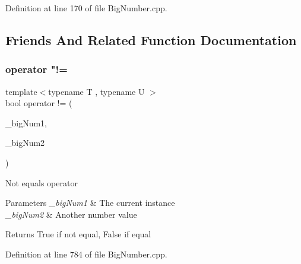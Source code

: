 Definition at line 170 of file Big\+Number.\+cpp.



\subsection{Friends And Related Function Documentation}
\mbox{\label{class_big_nums_1_1_big_number_a7311ab2265ec5536725ffdc2dcfb7dcb}} 
\subsubsection{\texorpdfstring{operator "!=}{operator !=}\hspace{0.1cm}{\footnotesize\ttfamily [1/2]}}
{\footnotesize\ttfamily template$<$typename T , typename U $>$ \\
bool operator != (\begin{DoxyParamCaption}\item[{const \mbox{\hyperlink{class_big_nums_1_1_big_number}{Big\+Number}} \&}]{\+\_\+big\+Num1,  }\item[{const \mbox{\hyperlink{class_big_nums_1_1_big_number}{Big\+Number}} \&}]{\+\_\+big\+Num2 }\end{DoxyParamCaption})\hspace{0.3cm}{\ttfamily [friend]}}

Not equals operator 
\begin{DoxyParams}{Parameters}
{\em \+\_\+big\+Num1} & The current instance \\
\hline
{\em \+\_\+big\+Num2} & Another number value \\
\hline
\end{DoxyParams}
\begin{DoxyReturn}{Returns}
True if not equal, False if equal 
\end{DoxyReturn}


Definition at line 784 of file Big\+Number.\+cpp.

\mbox{\label{class_big_nums_1_1_big_number_a06943b4fe9e60b40857108c3d1a40c4b}} 
